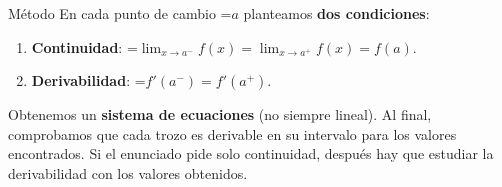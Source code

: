 \documentclass[11pt,a4paper]{article}
\newcommand{\fmm}[1]{\setbox0=\hbox{$#1$}\ifdim\wd0>\linewidth\fmdisp{#1}\else\mbox{\box0}\fi}
\newcommand{\fmdisp}[1]{\[\setbox2=\hbox{$\displaystyle #1$}\ifdim\wd2>\linewidth\resizebox{\linewidth}{!}{\box2}\else\box2\fi\]}
\begin{document}
\begin{fmdef}{Método}
En cada punto de cambio \fmm{a} planteamos \textbf{dos condiciones}:

\begin{enumerate}
\item \textbf{Continuidad}: \fmm{\displaystyle\lim_{x\to a^-}f(x)=\lim_{x\to a^+}f(x)=f(a)}.
\item \textbf{Derivabilidad}: \fmm{f'(a^-)=f'(a^+)}.
\end{enumerate}

Obtenemos un \textbf{sistema de ecuaciones} (no siempre lineal). Al final, comprobamos que cada trozo es derivable en su intervalo para los valores encontrados. Si el enunciado pide solo continuidad, después hay que estudiar la derivabilidad con los valores obtenidos.
\end{fmdef}
\end{document}
